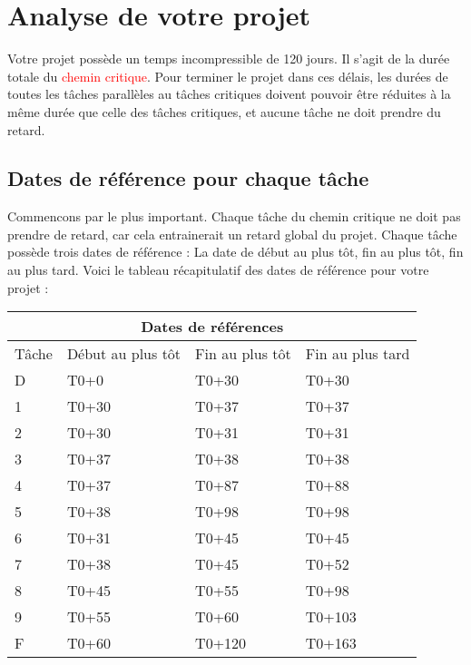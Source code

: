 \documentclass{article}
\begin{document}
\section{Analyse de votre projet}
Votre projet possède un temps incompressible de 120 jours.
    Il s'agit de la durée totale du \textcolor{red}{chemin critique}.
    Pour terminer le projet dans ces délais, les durées de toutes les tâches parallèles au tâches critiques doivent pouvoir être réduites
    à la même durée que celle des tâches critiques, et aucune tâche ne doit prendre du retard.\subsection{Dates de référence pour chaque tâche}Commencons par le plus important. Chaque tâche du chemin critique ne doit pas prendre de
    retard, car cela entrainerait un retard global du projet.
    Chaque tâche possède trois dates de référence : La date de début au plus tôt,
    fin au plus tôt, fin au plus tard.
    Voici le tableau récapitulatif des dates de référence pour votre projet :\newline 
\begin{tabular}{ |p{3cm}||p{3cm}|p{3cm}|p{3cm}|  }
        \hline
        \multicolumn{4}{|c|}{Dates de références} \\
        \hline 
        Tâche&Début au plus tôt&Fin au plus tôt&Fin au plus tard \\ 
        \hline 
 D&T0+0&T0+30&T0+30 \\ 
 1&T0+30&T0+37&T0+37 \\ 
 2&T0+30&T0+31&T0+31 \\ 
 3&T0+37&T0+38&T0+38 \\ 
 4&T0+37&T0+87&T0+88 \\ 
 5&T0+38&T0+98&T0+98 \\ 
 6&T0+31&T0+45&T0+45 \\ 
 7&T0+38&T0+45&T0+52 \\ 
 8&T0+45&T0+55&T0+98 \\ 
 9&T0+55&T0+60&T0+103 \\ 
 F&T0+60&T0+120&T0+163 \\ 
\hline
    \end{tabular} 
\end{document}
